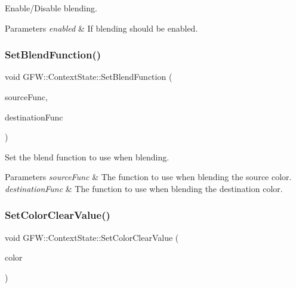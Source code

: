 Enable/\+Disable blending. 


\begin{DoxyParams}{Parameters}
{\em enabled} & If blending should be enabled. \\
\hline
\end{DoxyParams}
\mbox{\label{class_g_f_w_1_1_context_state_ab2f28c92d5d196ab04c085b3a519fd10}} 
\subsubsection{\texorpdfstring{Set\+Blend\+Function()}{SetBlendFunction()}}
{\footnotesize\ttfamily void G\+F\+W\+::\+Context\+State\+::\+Set\+Blend\+Function (\begin{DoxyParamCaption}\item[{\hyperlink{namespace_g_f_w_ac19434e926d01e02140f07e74ff36f3c}{Blend\+Function}}]{source\+Func,  }\item[{\hyperlink{namespace_g_f_w_ac19434e926d01e02140f07e74ff36f3c}{Blend\+Function}}]{destination\+Func }\end{DoxyParamCaption})}



Set the blend function to use when blending. 


\begin{DoxyParams}{Parameters}
{\em source\+Func} & The function to use when blending the source color. \\
\hline
{\em destination\+Func} & The function to use when blending the destination color. \\
\hline
\end{DoxyParams}
\mbox{\label{class_g_f_w_1_1_context_state_aa38214d4dd523c36e281c93125691dc5}} 
\subsubsection{\texorpdfstring{Set\+Color\+Clear\+Value()}{SetColorClearValue()}}
{\footnotesize\ttfamily void G\+F\+W\+::\+Context\+State\+::\+Set\+Color\+Clear\+Value (\begin{DoxyParamCaption}\item[{const \hyperlink{namespace_g_f_w_1_1_math_a22b76a9624ba36b0f4eaa46d2e6b1fae}{Vec4} \&}]{color }\end{DoxyParamCaption})}



